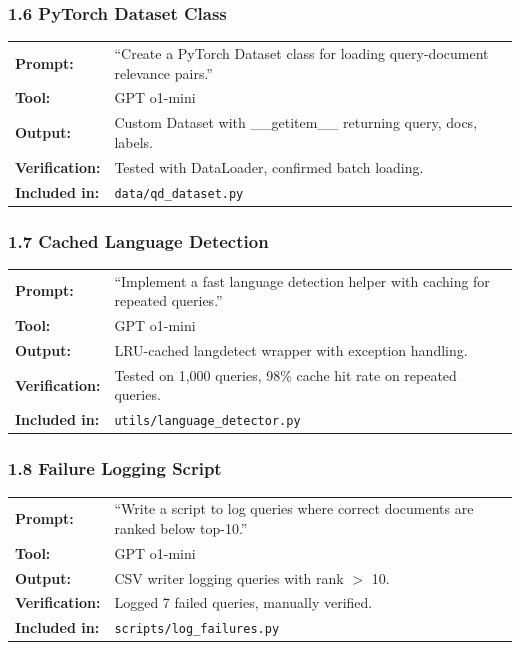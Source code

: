 \documentclass[12pt,a4paper]{article}
\begin{document}
\subsubsection*{1.6 PyTorch Dataset Class}
\begin{tabular}{p{3.2cm}p{9.5cm}}
\textbf{Prompt:}        & ``Create a PyTorch Dataset class for loading query-document relevance pairs.'' \\
\textbf{Tool:}          & GPT o1-mini \\
\textbf{Output:}        & Custom Dataset with \_\_getitem\_\_ returning query, docs, labels. \\
\textbf{Verification:}  & Tested with DataLoader, confirmed batch loading. \\
\textbf{Included in:}   & \texttt{data/qd\_dataset.py} \\
\end{tabular}

\subsubsection*{1.7 Cached Language Detection}
\begin{tabular}{p{3.2cm}p{9.5cm}}
\textbf{Prompt:}        & ``Implement a fast language detection helper with caching for repeated queries.'' \\
\textbf{Tool:}          & GPT o1-mini \\
\textbf{Output:}        & LRU-cached langdetect wrapper with exception handling. \\
\textbf{Verification:}  & Tested on 1,000 queries, 98\% cache hit rate on repeated queries. \\
\textbf{Included in:}   & \texttt{utils/language\_detector.py} \\
\end{tabular}

\subsubsection*{1.8 Failure Logging Script}
\begin{tabular}{p{3.2cm}p{9.5cm}}
\textbf{Prompt:}        & ``Write a script to log queries where correct documents are ranked below top-10.'' \\
\textbf{Tool:}          & GPT o1-mini \\
\textbf{Output:}        & CSV writer logging queries with rank $>$ 10. \\
\textbf{Verification:}  & Logged 7 failed queries, manually verified. \\
\textbf{Included in:}   & \texttt{scripts/log\_failures.py} \\
\end{tabular}
\end{document}
